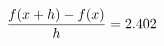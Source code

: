 \documentclass[preview]{standalone}
\begin{document}
\begin{align*}
\special{dvisvgm:raw <g id='unique000'>}\frac{f(x+h)-f(x)}{h} = 2.402\special{dvisvgm:raw </g>}
\end{align*}
\end{document}
